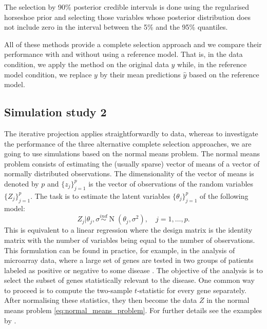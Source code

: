 \documentclass[a4]{article}
\theoremstyle{definition}
\DeclareMathOperator{\N}{N}
\begin{document}
The selection
by 90\% posterior credible intervals is done using the regularised
horseshoe prior  and selecting those variables whose posterior
distribution does not include zero in the interval between the 5\% and
the 95\% quantiles.

All of these methods provide a complete selection approach and we
compare their performance with and without using a reference model.
That is, in the data condition, we apply the method on the original
data $y$ while, in the reference model condition, we replace $y$ by
their mean predictions $\hat{y}$ based on the reference model.
  

\subsection{Simulation study 2}
\label{simulations}

The iterative projection applies straightforwardly to data, whereas
to investigate the performance of the three alternative complete selection approaches,
we are going to use simulations based on the normal means problem.
The normal means problem consists of estimating the (usually
sparse) vector of means of a vector of normally distributed
observations. The dimensionality of the vector of means is denoted by
$p$ and $\{z_{j}\}_{j=1}^{p}$ is the vector of observations of the
random variables $\{Z_{j}\}_{j=1}^{p}$. The task is to estimate the
latent variables $\{\theta_{j}\}_{j=1}^{p}$ of the following model: \
\begin{equation}\label{eq:normal_means_problem}
Z_{j}|\theta_{j},\sigma\overset{ind}{\sim}\N(\theta_{j},\sigma^{2}), \quad j=1,\ldots,p.
\end{equation}
This is equivalent to a linear regression where the design matrix is
the identity matrix with the number of variables being equal to the
number of observations. This formulation can be found in practice, for
example, in the analysis of microarray data, where a large set of
genes are tested in two groups of patients labeled as positive or
negative to some disease \citep{paper:efron,efron2012large}. The
objective of the analysis is to select the subset of genes
statistically relevant to the disease. One common way to proceed is to
compute the two-sample $t$-statistic for every gene separately.  After
normalising these statistics, they then become the data $Z$ in the
normal means problem \eqref{eq:normal_means_problem}. For further
details see the examples by \cite{paper:efron, efron2012large}.
\end{document}
